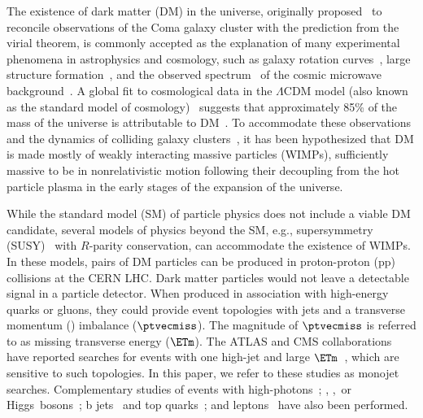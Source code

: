 The existence of dark matter (DM) in the universe, originally proposed~\cite{Zwicky:1937zza} to
reconcile observations of the Coma galaxy cluster with
the prediction from the virial theorem, is
commonly accepted as the explanation of many experimental
phenomena in astrophysics and cosmology, such as galaxy rotation
curves~\cite{vandeHulst,Rubin:1980zd}, large structure
formation~\cite{White:1987yr,Carlberg:1989yr,Springel:2005nw}, and the
observed
spectrum~\cite{Smoot:1992td,deBernardis:2000gy,Spergel:2006hy,Ade:2013zuv}
of the cosmic microwave background~\cite{Bardeen:1985tr}. A global fit to
cosmological data in the $\Lambda$CDM model (also known as
the standard model of cosmology)~\cite{Cen:2000xv} suggests that
approximately 85\% of the mass of the universe is attributable to
DM~\cite{Ade:2013zuv}. To accommodate these observations and the
dynamics of colliding galaxy clusters~\cite{Clowe:2006eq}, it has been
hypothesized that DM is made mostly of weakly
interacting massive particles
(WIMPs), sufficiently massive to be in nonrelativistic motion
following their decoupling from the hot particle plasma in the early
stages of the expansion of the universe.

While the standard model (SM) of particle physics does not include a
viable DM candidate, several models of physics beyond the SM, e.g.,
supersymmetry (SUSY)~\cite{Ramond,Golfand,Volkov,Wess,Fayet} with $R$-parity
conservation, can accommodate the existence of WIMPs. In these models,
pairs of DM particles can be produced in proton-proton (pp) collisions at
the CERN LHC. Dark matter particles would not leave a detectable signal in
a particle detector. When produced in association with high-energy
quarks or gluons, they could provide event topologies with
jets and a transverse momentum (\pt) imbalance ($\ptvecmiss$). The magnitude of $\ptvecmiss$ is referred to as missing transverse energy ($\ETm$).
The ATLAS and CMS collaborations have reported searches for events with one
high-\pt jet and large $\ETm$~\cite{Aad:2011xw,Chatrchyan:2012me}, which are sensitive to such topologies.
In this paper, we refer to these studies as monojet searches. Complementary studies of events with
high-\pt photons~\cite{Khachatryan:2014rwa,Aad:2014tda}; \PW,
\cPZ,~or
Higgs~bosons~\cite{Aad:2013oja,Aad:2014vka,Aad:2015dva,Aad:2015yga};
b jets~\cite{Aad:2014vea} and top quarks~\cite{Aad:2014vea,CMS:b2g12-022,CMS:semilepTop}; and leptons~\cite{ATLAS:2014wra,Khachatryan:2014tva}
have also been performed.

